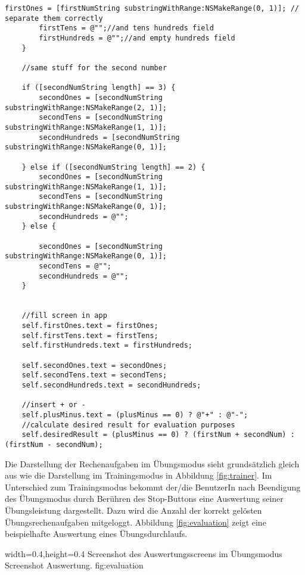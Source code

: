 \begin{lstlisting}[caption=Generierung von Rechenaufgaben im Übungsmodus, label=listing:problemGeneration]
        firstOnes = [firstNumString substringWithRange:NSMakeRange(0, 1)]; // separate them correctly
        firstTens = @"";//and tens hundreds field
        firstHundreds = @"";//and empty hundreds field
    }
    
    //same stuff for the second number
    
    if ([secondNumString length] == 3) {
        secondOnes = [secondNumString substringWithRange:NSMakeRange(2, 1)];
        secondTens = [secondNumString substringWithRange:NSMakeRange(1, 1)];
        secondHundreds = [secondNumString substringWithRange:NSMakeRange(0, 1)];
        
    } else if ([secondNumString length] == 2) {
        secondOnes = [secondNumString substringWithRange:NSMakeRange(1, 1)];
        secondTens = [secondNumString substringWithRange:NSMakeRange(0, 1)];
        secondHundreds = @"";
    } else {
        
        secondOnes = [secondNumString substringWithRange:NSMakeRange(0, 1)];
        secondTens = @"";
        secondHundreds = @"";
    }

    
    //fill screen in app
    self.firstOnes.text = firstOnes;
    self.firstTens.text = firstTens;
    self.firstHundreds.text = firstHundreds;
    
    self.secondOnes.text = secondOnes;
    self.secondTens.text = secondTens;
    self.secondHundreds.text = secondHundreds;
    
    //insert + or -
    self.plusMinus.text = (plusMinus == 0) ? @"+" : @"-";
    //calculate desired result for evaluation purposes
    self.desiredResult = (plusMinus == 0) ? (firstNum + secondNum) : (firstNum - secondNum);
\end{lstlisting}

Die Darstellung der Rechenaufgaben im Übungsmodus sieht grundsätzlich gleich aus wie die Darstellung 
im Trainingsmodus in Abbildung \ref{fig:trainer}. Im Unterschied zum Trainingsmodus bekommt der/die
BenutzerIn nach Beendigung des Übungsmodus durch Berühren des Stop-Buttons eine Auswertung seiner 
Übungsleistung dargestellt. Dazu wird die Anzahl der korrekt gelösten Übungsrechenaufgaben mitgeloggt.
Abbildung \ref{fig:evaluation} zeigt eine beispielhafte Auswertung eines Übungsdurchlaufs.

  {width=0.4\textwidth,height=0.4\textheight}%
  {Screenshot des Auswertungsscreens im Übungsmodus}%
  {Screenshot Auswertung.}%
  {fig:evaluation}%

